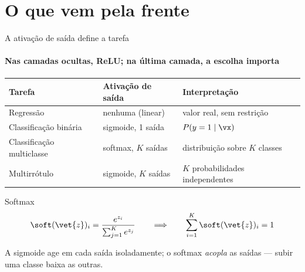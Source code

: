 \documentclass[aspectratio=169, 11pt]{beamer}
\begin{document}
\section{O que vem pela frente}

\begin{frame}{A ativação de saída define a tarefa}
  \framesubtitle{Nas camadas ocultas, ReLU; na última camada, a escolha importa}

  \begin{center}\scriptsize
  \begin{tabular}{@{}lll@{}}
    \toprule
    \textbf{Tarefa} & \textbf{Ativação de saída} & \textbf{Interpretação}\\
    \midrule
    Regressão & nenhuma (linear) & valor real, sem restrição\\
    Classificação binária & sigmoide, 1 saída & $P(y = 1 \mid \vx)$\\
    Classificação multiclasse & softmax, $K$ saídas & distribuição sobre $K$ classes\\
    Multirrótulo & sigmoide, $K$ saídas & $K$ probabilidades independentes\\
    \bottomrule
  \end{tabular}
  \end{center}

  \vspace{-0.5em}
  \begin{defbox}{Softmax}
    \[
      \soft(\vet{z})_i = \frac{e^{z_i}}{\sum_{j=1}^{K} e^{z_j}}
      \qquad\Longrightarrow\qquad
      \sum_{i=1}^{K} \soft(\vet{z})_i = 1
    \]
  \end{defbox}

  \vspace{-0.5em}
  \begin{ideiabox}
    A sigmoide age em cada saída isoladamente; o softmax \emph{acopla} as
    saídas — subir uma classe baixa as outras.
  \end{ideiabox}
\end{frame}
\end{document}
